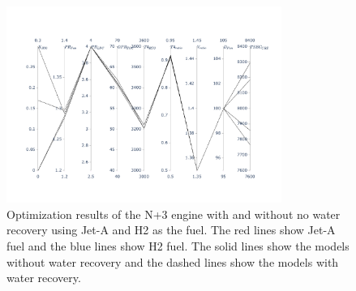 \documentclass[conf]{new-aiaa}
\begin{document}
\begin{figure}[hbt!]
    \centering
    \includegraphics[width=0.8\textwidth]{N3_parallel_coords.pdf}
    \caption{Optimization results of the N+3 engine with and without no water recovery using Jet-A and H2 as the fuel.
        The red lines show Jet-A fuel and the blue lines show H2 fuel.
        The solid lines show the models without water recovery and the dashed lines show the models with water recovery.}
    \label{fig:parallel_coords}
\end{figure}
\end{document}
